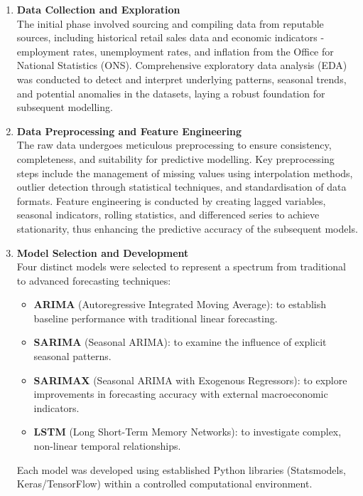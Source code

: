 \documentclass[12pt,a4paper]{report}
\begin{document}
\begin{enumerate}
    \item \textbf{Data Collection and Exploration}\\
    The initial phase involved sourcing and compiling data from reputable sources, including historical retail sales data and economic indicators - employment rates, unemployment rates, and inflation from the Office for National Statistics (ONS). Comprehensive exploratory data analysis (EDA) was conducted to detect and interpret underlying patterns, seasonal trends, and potential anomalies in the datasets, laying a robust foundation for subsequent modelling.
    
    \item \textbf{Data Preprocessing and Feature Engineering}\\
    The raw data undergoes meticulous preprocessing to ensure consistency, completeness, and suitability for predictive modelling. Key preprocessing steps include the management of missing values using interpolation methods, outlier detection through statistical techniques, and standardisation of data formats. Feature engineering is conducted by creating lagged variables, seasonal indicators, rolling statistics, and differenced series to achieve stationarity, thus enhancing the predictive accuracy of the subsequent models.
    
    \item \textbf{Model Selection and Development}\\
    Four distinct models were selected to represent a spectrum from traditional to advanced forecasting techniques:
    \begin{itemize}
        \item \textbf{ARIMA} (Autoregressive Integrated Moving Average): to establish baseline performance with traditional linear forecasting.
        \item \textbf{SARIMA} (Seasonal ARIMA): to examine the influence of explicit seasonal patterns.
        \item \textbf{SARIMAX} (Seasonal ARIMA with Exogenous Regressors): to explore improvements in forecasting accuracy with external macroeconomic indicators.
        \item \textbf{LSTM} (Long Short-Term Memory Networks): to investigate complex, non-linear temporal relationships.
    \end{itemize}
    Each model was developed using established Python libraries (Statsmodels, Keras/TensorFlow) within a controlled computational environment.
    

\end{enumerate}
\end{document}

